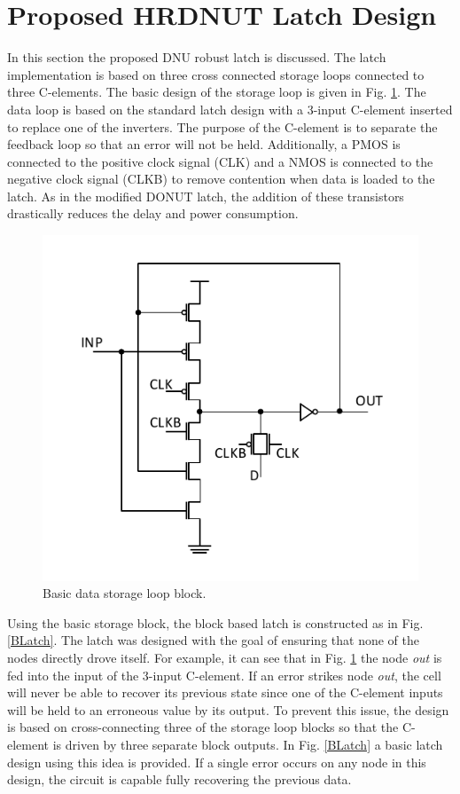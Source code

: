 \section{Proposed HRDNUT Latch Design} \label{Proposed}
In this section the proposed DNU robust latch is discussed. The latch implementation is based on three cross connected storage loops connected to three C-elements. The basic design of the storage loop is given in Fig. \ref{Block}. The data loop is based on the standard latch design with a 3-input C-element inserted to replace one of the inverters. The purpose of the C-element is to separate the feedback loop so that an error will not be held. Additionally, a PMOS is connected to the positive clock signal (CLK) and a NMOS is connected to the negative clock signal (CLKB) to remove contention when data is loaded to the latch. As in the modified DONUT latch, the addition of these transistors drastically reduces the delay and power consumption.    

\begin{figure}[h]
	\centering
	\includegraphics[width=0.5\linewidth]{Figures/Block}
	\caption{Basic data storage loop block.}
	\label{Block}
\end{figure} 

Using the basic storage block, the block based latch is constructed as in Fig. \ref{BLatch}. The latch was designed with the goal of ensuring that none of the nodes directly drove itself. For example, it can see that in Fig. \ref{Block} the node \textit{out} is fed into the input of the 3-input C-element. If an error strikes node \textit{out}, the cell will never be able to recover its previous state since one of the C-element inputs will be held to an erroneous value by its output. To prevent this issue, the design is based on cross-connecting three of the storage loop blocks so that the C-element is driven by three separate block outputs. In Fig. \ref{BLatch} a basic latch design using this idea is provided. If a single error occurs on any node in this design, the circuit is capable fully recovering the previous data. 

